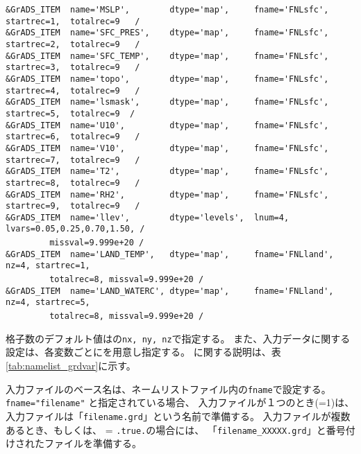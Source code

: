 {\verb|&GrADS_ITEM  name='MSLP',        dtype='map',     fname='FNLsfc', startrec=1,  totalrec=9   / |  \\
\verb|&GrADS_ITEM  name='SFC_PRES',    dtype='map',     fname='FNLsfc', startrec=2,  totalrec=9   / |  \\
\verb|&GrADS_ITEM  name='SFC_TEMP',    dtype='map',     fname='FNLsfc', startrec=3,  totalrec=9   / |  \\
\verb|&GrADS_ITEM  name='topo',        dtype='map',     fname='FNLsfc', startrec=4,  totalrec=9   / |  \\
\verb|&GrADS_ITEM  name='lsmask',      dtype='map',     fname='FNLsfc', startrec=5,  totalrec=9  /  |  \\
\verb|&GrADS_ITEM  name='U10',         dtype='map',     fname='FNLsfc', startrec=6,  totalrec=9   / |  \\
\verb|&GrADS_ITEM  name='V10',         dtype='map',     fname='FNLsfc', startrec=7,  totalrec=9   / |  \\
\verb|&GrADS_ITEM  name='T2',          dtype='map',     fname='FNLsfc', startrec=8,  totalrec=9   / |  \\
\verb|&GrADS_ITEM  name='RH2',         dtype='map',     fname='FNLsfc', startrec=9,  totalrec=9   / |  \\
\verb|&GrADS_ITEM  name='llev',        dtype='levels',  lnum=4, lvars=0.05,0.25,0.70,1.50, /        |  \\
~~~~~~~~\verb| missval=9.999e+20 /|  \\
\verb|&GrADS_ITEM  name='LAND_TEMP',   dtype='map',     fname='FNLland', nz=4, startrec=1, |\\
~~~~~~~~\verb| totalrec=8, missval=9.999e+20 /|  \\
\verb|&GrADS_ITEM  name='LAND_WATERC', dtype='map',     fname='FNLland', nz=4, startrec=5, |\\
~~~~~~~~\verb| totalrec=8, missval=9.999e+20 /|  \\
}


格子数のデフォルト値はの\verb|nx, ny, nz|で指定する。
また、入力データに関する設定は、各変数ごとにを用意し指定する。
に関する説明は、表\ref{tab:namelist_grdvar}に示す。

入力ファイルのベース名は、ネームリストファイル内の\verb|fname|で設定する。
\verb|fname="filename"| と指定されている場合、
入力ファイルが１つのとき(=1)は、入力ファイルは「\verb|filename.grd|」という名前で準備する。
入力ファイルが複数あるとき、もしくは、 = \verb|.true.|の場合には、
「\verb|filename_XXXXX.grd|」と番号付けされたファイルを準備する。

